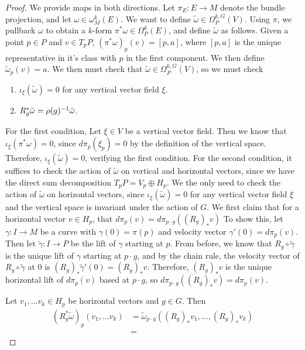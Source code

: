 \begin{proof}%
We provide maps in both directions. Let $\pi_E : E \to M$ denote the bundle
projection, and let $\omega \in \omega_M^k(E)$. We want to define
$\widetilde{\omega} \in \Omega_P^{k,G}(V)$. Using $\pi$, we pullback
$\omega$ to obtain a $k$-form $\pi^*\omega \in \Omega_P^k(E)$, and define
$\tilde{\omega}$ as follows. Given a point $p \in P$ and $v \in T_pP$,
$(\pi^*\omega)_p(v) = [p, a]$, where $[p,a]$ is the unique representative in
it's class with $p$ in the first component. We then define
$\tilde{\omega}_p(v) = a$. We then must check that
$\tilde{\omega} \in \Omega^{k,G}_P(V)$, so we must check
\begin{enumerate}
  \item $\iota_{\xi}(\tilde{\omega}) = 0$ for any vertical vector field $\xi$.
  \item $R_g^*\tilde{\omega} = \rho(g)^{-1}\tilde{\omega}$.
\end{enumerate}
For the first condition, Let $\xi \in V$ be a vertical vector field. Then we know that
$\iota_{\xi}(\pi^*\omega)= 0$, since $d\pi_p(\xi_p) = 0$ by the definition of the
vertical space. Therefore, $\iota_{\xi}(\tilde{\omega}) = 0$, verifying the
first condition. For the second condition, it suffices to check the action of
$\tilde{\omega}$ on vertical and horizontal vectors, since we have the direct
sum decomposition $T_pP = V_p \oplus H_p$. We the only need to check the action
of $\tilde{\omega}$ on horizontal vectors, since $\iota_\xi({\tilde{\omega}}) = 0$
for any vertical vector field $\xi$ and the vertical space is invariant under the
action of $G$. We first claim that for a horizontal vector $v \in H_p$, that
$d\pi_p(v) = d\pi_{p \cdot g}((R_g)_*v)$ To show this, let $\gamma : I \to M$
be a curve with $\gamma(0) = \pi(p)$ and velocity vector $\gamma'(0) = d\pi_p(v)$.
Then let $\tilde{\gamma} : I \to P$ be the lift of $\gamma$ starting at $p$.
From before, we know that $R_g \circ \tilde{\gamma}$ is the unique lift
of $\gamma$ starting at $p \cdot g$, and by the chain rule, the velocity vector
of $R_g \circ \tilde{\gamma}$ at $0$ is $(R_g)_*\tilde{\gamma}'(0) = (R_g)_*v$. Therefore,
$(R_g)_*v$ is the unique horizontal lift of $d\pi_p(v)$ based at $p \cdot g$,
so $d\pi_{p \cdot g}((R_g)_*v) = d\pi_p(v)$.

Let $v_1, \ldots v_k \in H_p$ be horizontal vectors and $g \in G$.
Then
\begin{align*}
(R_g^*\tilde{\omega})_p(v_1,\ldots v_k) &=
\tilde{\omega}_{p \cdot g}((R_g)_*v_1, \ldots , (R_g)_* v_k)\\
&=
\end{align*}
%


\end{proof}
%

